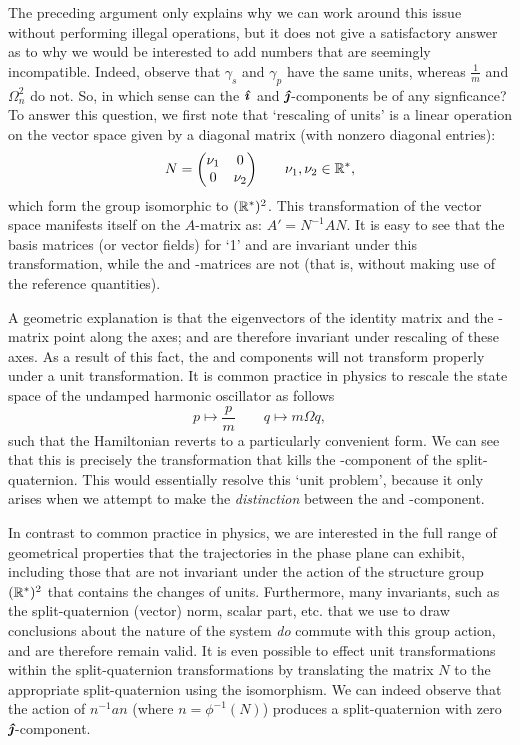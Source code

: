 The preceding argument only explains why we can work around this issue without performing illegal operations, but it does not give a satisfactory answer as to why we would be interested to add numbers that are seemingly incompatible. Indeed, observe that $\gamma_s$ and $\gamma_p$ have the same units, whereas $\tfrac{1}{m}$ and $\Omega_n^2$ do not. So, in which sense can the $\quati$ and $\quatj$-components be of any signficance? To answer this question, we first note that `rescaling of units' is a linear operation on the vector space given by a diagonal matrix (with nonzero diagonal entries): 
$$ N = \mqty(\dmat[0]{\nu_1}{\nu_2}) \qquad \nu_1, \nu_2 \in \real^*, $$
which form the group isomorphic to $(\real^*)^2$. This transformation of the vector space manifests itself on the $A$-matrix as: $ A' = N^{-1}A N$. It is easy to see that the basis matrices (or vector fields) for `1' and \quatk are invariant under this transformation, while the \quati and \quatj-matrices are not (that is, without making use of the reference quantities). 

A geometric explanation is that the eigenvectors of the identity matrix and the \quatk-matrix point along the axes; and are therefore invariant under rescaling of these axes. As a result of this fact, the \quati and \quatj components will not transform properly under a unit transformation. It is common practice in physics to rescale the state space of the undamped harmonic oscillator as follows \cite{Dekker1981,Dedene1980}
$$ p \mapsto \frac{p}{m} \qquad q \mapsto m\Omega q, $$
such that the Hamiltonian reverts to a particularly convenient form. We can see that this is precisely the transformation that kills the \quatj-component of the split-quaternion. This would essentially resolve this `unit problem', because it only arises when we attempt to make the \emph{distinction} between the \quati and \quatj-component.

In contrast to common practice in physics, we are interested in the full range of geometrical properties that the trajectories in the phase plane can exhibit, including those that are not invariant under the action of the structure group $(\real^*)^2$ that contains the changes of units. Furthermore, many invariants, such as the split-quaternion (vector) norm, scalar part, etc. that we use to draw conclusions about the nature of the system \emph{do} commute with this group action, and are therefore remain valid. It is even possible to effect unit transformations within the split-quaternion transformations by translating the matrix $N$ to the appropriate split-quaternion using the isomorphism. We can indeed observe that the action of $n^{-1} a n$ (where $n = \phi^{-1}(N)$) produces a split-quaternion with zero $\quatj$-component. 

